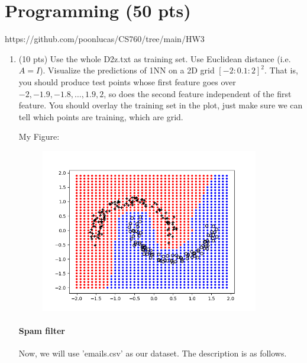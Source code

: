 \documentclass[a4paper]{article}
\theoremstyle{definition}
\newenvironment{soln}{
    \leavevmode\color{blue}\ignorespaces
}{}
\begin{document}
\section{Programming (50 pts)}
\begin{soln} https://github.com/poonlucas/CS760/tree/main/HW3 \end{soln}
\begin{enumerate}
	\item (10 pts) Use the whole D2z.txt as training set.  Use Euclidean distance (i.e. $A=I$).
	Visualize the predictions of 1NN on a 2D grid $[-2:0.1:2]^2$.
	That is, you should produce test points whose first feature goes over $-2, -1.9, -1.8, \ldots, 1.9, 2$, so does the second feature independent of the first feature.
	You should overlay the training set in the plot, just make sure we can tell which points are training, which are grid.
	
	\begin{soln}
             My Figure:
    	\begin{figure}[h]
    		\centering
    		\includegraphics[width=0.9\textwidth]{images/D2z.png}
    	\end{figure}
         \end{soln}

        \newpage
	\paragraph{Spam filter} Now, we will use 'emails.csv' as our dataset. The description is as follows.
	

\end{enumerate}
\end{document}
